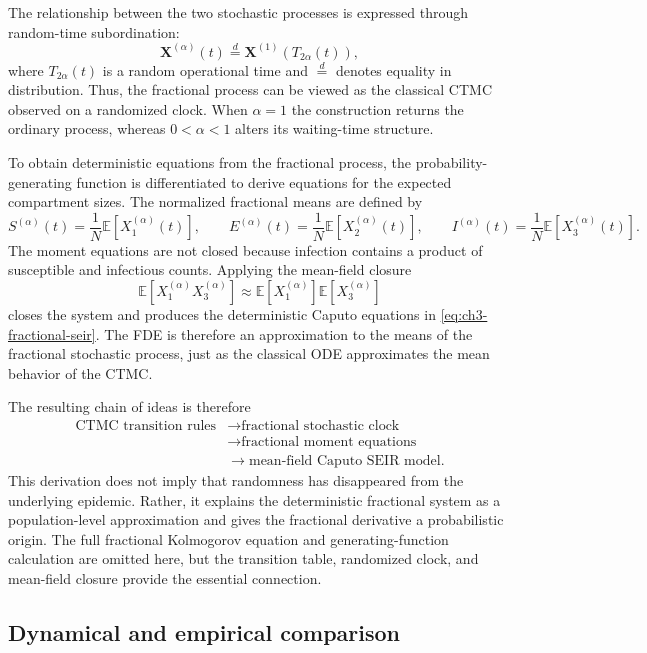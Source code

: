 \documentclass[00-main.tex]{subfiles}
\begin{document}
The relationship between the two stochastic processes is expressed through random-time subordination:
\[
\boldsymbol{X}^{(\alpha)}(t)
\overset{d}{=}
\boldsymbol{X}^{(1)}\!\left(T_{2\alpha}(t)\right),
\]
where $T_{2\alpha}(t)$ is a random operational time and $\overset{d}{=}$ denotes equality in distribution.
Thus, the fractional process can be viewed as the classical CTMC observed on a randomized clock.
When $\alpha=1$ the construction returns the ordinary process, whereas $0<\alpha<1$ alters its waiting-time structure.

To obtain deterministic equations from the fractional process, the probability-generating function is differentiated to derive equations for the expected compartment sizes.
The normalized fractional means are defined by
\[
S^{(\alpha)}(t)=\frac{1}{N}\mathbb{E}\!\left[X_1^{(\alpha)}(t)\right],\qquad
E^{(\alpha)}(t)=\frac{1}{N}\mathbb{E}\!\left[X_2^{(\alpha)}(t)\right],\qquad
I^{(\alpha)}(t)=\frac{1}{N}\mathbb{E}\!\left[X_3^{(\alpha)}(t)\right].
\]
The moment equations are not closed because infection contains a product of susceptible and infectious counts.
Applying the mean-field closure
\[
\mathbb{E}\!\left[X_1^{(\alpha)}X_3^{(\alpha)}\right]
\approx
\mathbb{E}\!\left[X_1^{(\alpha)}\right]
\mathbb{E}\!\left[X_3^{(\alpha)}\right]
\]
closes the system and produces the deterministic Caputo equations in \eqref{eq:ch3-fractional-seir}.
The FDE is therefore an approximation to the means of the fractional stochastic process, just as the classical ODE approximates the mean behavior of the CTMC.

The resulting chain of ideas is therefore
\[
\begin{aligned}
\text{CTMC transition rules}
&\longrightarrow \text{fractional stochastic clock}\\[3pt]
&\longrightarrow \text{fractional moment equations}\\[3pt]
&\longrightarrow \text{mean-field Caputo SEIR model}.
\end{aligned}
\]
This derivation does not imply that randomness has disappeared from the underlying epidemic.
Rather, it explains the deterministic fractional system as a population-level approximation and gives the fractional derivative a probabilistic origin.
The full fractional Kolmogorov equation and generating-function calculation are omitted here, but the transition table, randomized clock, and mean-field closure provide the essential connection.


\subsection{Dynamical and empirical comparison}
\end{document}
